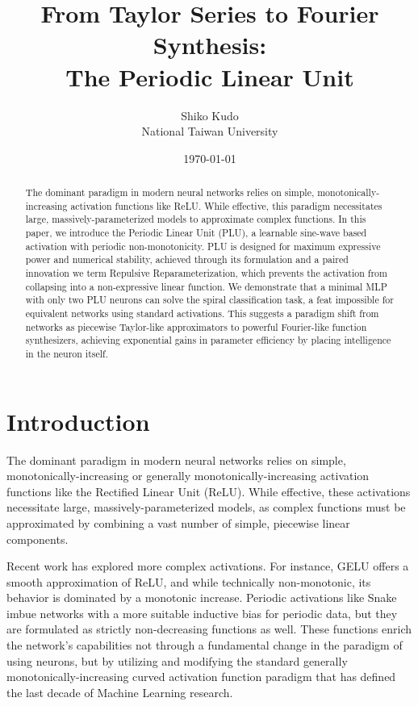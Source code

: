 \documentclass[11pt, letterpaper]{article}
\title{From Taylor Series to Fourier Synthesis: \\ The Periodic Linear Unit}
\author{Shiko Kudo \\ National Taiwan University}
\date{\today}
\begin{document}
\maketitle

\begin{abstract}
The dominant paradigm in modern neural networks relies on simple, monotonically-increasing activation functions like ReLU. While effective, this paradigm necessitates large, massively-parameterized models to approximate complex functions. In this paper, we introduce the Periodic Linear Unit (PLU), a learnable sine-wave based activation with periodic non-monotonicity. PLU is designed for maximum expressive power and numerical stability, achieved through its formulation and a paired innovation we term Repulsive Reparameterization, which prevents the activation from collapsing into a non-expressive linear function. We demonstrate that a minimal MLP with only two PLU neurons can solve the spiral classification task, a feat impossible for equivalent networks using standard activations. This suggests a paradigm shift from networks as piecewise Taylor-like approximators to powerful Fourier-like function synthesizers, achieving exponential gains in parameter efficiency by placing intelligence in the neuron itself.
\end{abstract}

\section{Introduction}

The dominant paradigm in modern neural networks relies on simple, monotonically-increasing or generally monotonically-increasing activation functions like the Rectified Linear Unit (ReLU). While effective, these activations necessitate large, massively-parameterized models, as complex functions must be approximated by combining a vast number of simple, piecewise linear components.

Recent work has explored more complex activations. For instance, GELU \cite{hendrycks2016gaussianerrorlinearunits} offers a smooth approximation of ReLU, and while technically non-monotonic, its behavior is dominated by a monotonic increase. Periodic activations like Snake \cite{ziyin2020neuralnetworksfaillearn} imbue networks with a more suitable inductive bias for periodic data, but they are formulated as strictly non-decreasing functions as well. These functions enrich the network's capabilities not through a fundamental change in the paradigm of using neurons, but by utilizing and modifying the standard generally monotonically-increasing curved activation function paradigm that has defined the last decade of Machine Learning research.
\end{document}

